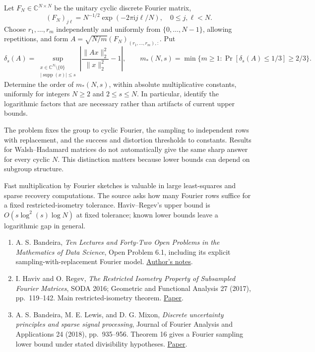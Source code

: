 \documentclass[11pt,a4paper]{article}
\makeatletter
\providecommand{\tightlist}{\setlength{\itemsep}{0pt}\setlength{\parskip}{0pt}}
\renewcommand{\subsection}{\Needspace{4\baselineskip}\@startsection{subsection}{2}{0pt}{9pt plus 1pt minus 1pt}{3pt}{\sffamily\bfseries\normalsize\color{ink}}}
\makeatother
\begin{document}
Let \(F_N\in\mathbb C^{N\times N}\) be the unitary cyclic discrete
Fourier matrix, \[
(F_N)_{j\ell}=N^{-1/2}\exp(-2\pi\mathrm i j\ell/N),\quad0\leq j,\ell<N.
\] Choose \(r_1,\ldots,r_m\) independently and uniformly from
\(\{0,\ldots,N-1\}\), allowing repetitions, and form
\(A=\sqrt{N/m}(F_N)_{(r_1,\ldots,r_m),:}\). Put \[
\delta_s(A)=\sup_{\substack{x\in\mathbb C^N\setminus\{0\}\\|\operatorname{supp}(x)|\leq s}}
\left|\frac{\|Ax\|_2^2}{\|x\|_2^2}-1\right|,
\qquad
m_*(N,s)=\min\{m\geq1:\Pr[\delta_s(A)\leq1/3]\geq2/3\}.
\] Determine the order of \(m_*(N,s)\), within absolute multiplicative
constants, uniformly for integers \(N\geq2\) and \(2\leq s\leq N\). In
particular, identify the logarithmic factors that are necessary rather
than artifacts of current upper bounds.

The problem fixes the group to cyclic Fourier, the sampling to
independent rows with replacement, and the success and distortion
thresholds to constants. Results for Walsh--Hadamard matrices do not
automatically give the same sharp answer for every cyclic \(N\). This
distinction matters because lower bounds can depend on subgroup
structure.

Fast multiplication by Fourier sketches is valuable in large
least-squares and sparse recovery computations. The source asks how many
Fourier rows suffice for a fixed restricted-isometry tolerance.
Haviv--Regev's upper bound is \(O(s\log^2(s)\log N)\) at fixed
tolerance; known lower bounds leave a logarithmic gap in general.

\newpage
\subsection{References}\label{references}

\begin{enumerate}
\def\labelenumi{\arabic{enumi}.}
\tightlist
\item
  A. S. Bandeira, \emph{Ten Lectures and Forty-Two Open Problems in the
  Mathematics of Data Science}, Open Problem 6.1, including its explicit
  sampling-with-replacement Fourier model.
  \href{https://people.math.ethz.ch/~abandeira/TenLecturesFortyTwoProblems.pdf}{Author's
  notes}.
\item
  I. Haviv and O. Regev, \emph{The Restricted Isometry Property of
  Subsampled Fourier Matrices}, SODA 2016; Geometric and Functional
  Analysis 27 (2017), pp.~119--142. Main restricted-isometry theorem.
  \href{https://arxiv.org/abs/1507.01768}{Paper}.
\item
  A. S. Bandeira, M. E. Lewis, and D. G. Mixon, \emph{Discrete
  uncertainty principles and sparse signal processing}, Journal of
  Fourier Analysis and Applications 24 (2018), pp.~935--956. Theorem 16
  gives a Fourier sampling lower bound under stated divisibility
  hypotheses. \href{https://arxiv.org/abs/1504.01014}{Paper}.
\end{enumerate}
\end{document}
